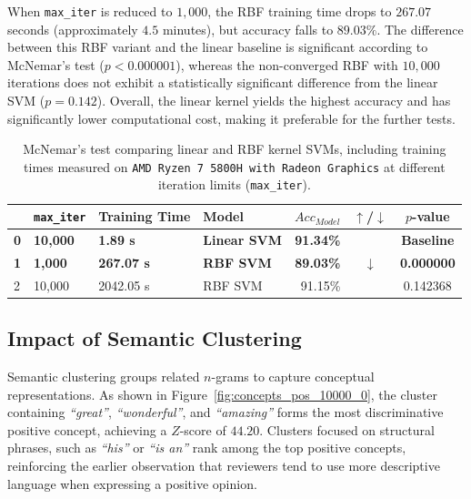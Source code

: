 \documentclass[a4paper,twoside,12pt]{book}
\newcommand{\zscore}{Z}
\newcommand{\code}[1]{\texttt{#1}}
\newcommand{\mcnemarp}{p}
\newcommand{\literal}[1]{\textit{``#1''}}
\begin{document}
When \code{max\_iter} is reduced to $1{,}000$, the RBF training time drops to $267.07$ seconds (approximately $4.5$ minutes), but accuracy falls to $89.03\%$.
The difference between this RBF variant and the linear baseline is significant according to McNemar's test ($\mcnemarp < 0.000001$), whereas the non-converged RBF with $10{,}000$ iterations does not exhibit a statistically significant difference from the linear SVM ($\mcnemarp = 0.142$).
Overall, the linear kernel yields the highest accuracy and has significantly lower computational cost, making it preferable for the further tests.

\begin{table}[tbp]
	\centering
	\caption{McNemar's test comparing linear and RBF kernel SVMs, including training times measured on \code{AMD Ryzen 7 5800H with Radeon Graphics} at different iteration limits (\code{max\_iter}).}
	\label{tab:McNemarSvms}
	\begin{tabular}{llllrcc}
		\toprule
		& \code{max\_iter} & Training Time & Model & $Acc_{Model}$ & $\uparrow$/$\downarrow$ & $\mcnemarp$-value \\
		\midrule
		\textbf{0} & \textbf{10,000} & \textbf{1.89 s} & \textbf{Linear SVM} & \textbf{91.34\%} & \textbf{} & \textbf{Baseline} \\
		\textbf{1} & \textbf{1,000} & \textbf{267.07 s} & \textbf{RBF SVM} & \textbf{89.03\%} & \textbf{$\downarrow$} & \textbf{0.000000} \\
		2 & 10,000 & 2042.05 s & RBF SVM & 91.15\% &  & 0.142368 \\
		\bottomrule
	\end{tabular}
\end{table}

\subsection{Impact of Semantic Clustering} \label{sec:Impact-of-Semantic-Clustering}

Semantic clustering groups related $n$-grams to capture conceptual representations. As shown in Figure~\ref{fig:concepts_pos_10000_0}, the cluster containing \literal{great}, \literal{wonderful}, and \literal{amazing} forms the most discriminative positive concept, achieving a $\zscore$-score of $44.20$. Clusters focused on structural phrases, such as \literal{his} or \literal{is an} rank among the top positive concepts, reinforcing the earlier observation that reviewers tend to use more descriptive language when expressing a positive opinion.
\end{document}
